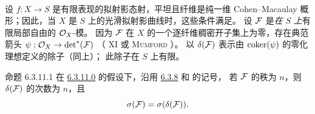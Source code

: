 \setcounter{subsubsection}{11}
\setcounter{paragraph}{-1}
\paragraph{}
设 $f:X\rightarrow S$ 是有限表现的拟射影态射，平坦且纤维是纯一维
Cohen--Macaulay 概形；因此，当 $X$ 是 $S$ 上的光滑拟射影曲线时，这些条件满足。
设 ${\mathcal F} $ 是\emph{在} $S$ \emph{上}有限局部自由的 ${\mathcal O}_{X}$-模。
因为 ${\mathcal F} $ 在 $X$ 的一个逐纤维稠密开子集上为零，存在典范箭头
$\psi:{\mathcal O}_{X}\rightarrow \det^{\ast}({\mathcal F} )$
（ XI 或 \textsc{Mumford}
）。
以 $\delta({\mathcal F} )$ 表示由 $\operatorname{coker}(\psi)$ 的零化理想定义的除子（同上）；
此除子在 $S$ 上有限。

\begin{enonce*}{命题 6.3.11.1}
在 \hyperref[XVII.par6.3.11.0]{6.3.11.0} 的假设下，沿用
\hyperref[XVII.subsubsec6.3.8]{6.3.8} 和  的记号，
若 ${\mathcal F} $ 的秩为 $n$，则 $\delta({\mathcal F} )$ 的次数为 $n$，且
\[
\sigma({\mathcal F} )=\sigma(\delta({\mathcal F} )){}.
\]
\end{enonce*}

